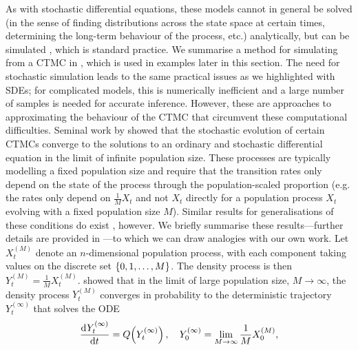 As with stochastic differential equations, these models cannot in general be solved (in the sense of finding distributions across the state space at certain times, determining the long-term behaviour of the process, etc.) analytically, but can be simulated \citep{Gillespie_1977_ExactStochasticSimulation}, which is standard practice.
We summarise a method for simulating from a CTMC in , which is used in examples later in this section.
The need for stochastic simulation leads to the same practical issues as we highlighted with SDEs; for complicated models, this is numerically inefficient and a large number of samples is needed for accurate inference.
However, these are approaches to approximating the behaviour of the CTMC that circumvent these computational difficulties.
Seminal work by \citet{Kurtz_1970_SolutionsOrdinaryDifferential,Kurtz_1971_LimitTheoremsSequences} showed that the stochastic evolution of certain CTMCs converge to the solutions to an ordinary and stochastic differential equation in the limit of infinite population size.
These processes are typically modelling a fixed population size and require that the transition rates only depend on the state of the process through the population-scaled proportion (e.g. the rates only depend on \(\frac1M X_t\) and not \(X_t\) directly for a population process \(X_t\) evolving with a fixed population size \(M\)).
Similar results for generalisations of these conditions do exist \citep{Pollett_1990_ModelInterferenceSearching}, however.
We briefly summarise these results---further details are provided in ---to which we can draw analogies with our own work.
Let \(X_t^{(M)}\) denote an \(n\)-dimensional population process, with each component taking values on the discrete set \(\set{0, 1, \dotsc, M}\).
The density process is then \(Y_t^{(M)} = \frac1M X_t^{(M)}\).
\citet{Kurtz_1970_SolutionsOrdinaryDifferential} showed that in the limit of large population size, \(M \to \infty\), the density process \(Y_t^{(M)}\) converges in probability to the deterministic trajectory \(Y_t^{(\infty)}\) that solves the ODE \citep{Kurtz_1970_SolutionsOrdinaryDifferential}
\begin{equation}\label{eqn:ctmc_ode}
	\dod{Y_t^{(\infty)}}{t} = Q\!\left(Y_t^{(\infty)}\right), \quad Y_0^{(\infty)} = \lim_{M\to\infty}\frac1M X^{(M)}_0,
\end{equation}
